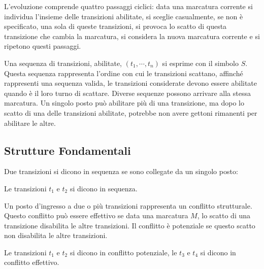 \documentclass{article}
\numberwithin{equation}{subsection}
\begin{document}
L'evoluzione comprende quattro passaggi ciclici: data una marcatura corrente si individua l'insieme delle transizioni abilitate, si sceglie casualmente, se non è specificato, 
una sola di queste transizioni, si provoca lo scatto di questa transizione che cambia la marcatura, si considera la nuova marcatura corrente e si ripetono questi passaggi. 

Una sequenza di transizioni, abilitate, $(t_1,\cdots,t_n)$ si esprime con il simbolo $S$. Questa sequenza rappresenta l'ordine con cui le transizioni scattano, affinché 
rappresenti una sequenza valida, le transizioni considerate devono essere abilitate quando è il loro turno di scattare. Diverse sequenze possono arrivare alla stessa 
marcatura. 
Un singolo posto può abilitare più di una transizione, ma dopo lo scatto di una delle transizioni abilitate, potrebbe non avere gettoni rimanenti per abilitare le altre. 

\subsection{Strutture Fondamentali}

Due transizioni si dicono in sequenza se sono collegate da un singolo posto:
\begin{center}
\end{center}
Le transizioni $t_1$ e $t_2$ si dicono in sequenza. 


Un posto d'ingresso a due o più transizioni rappresenta un conflitto strutturale. Questo conflitto può essere effettivo se data una marcatura $M$, lo scatto di una transizione 
disabilita le altre transizioni. Il conflitto è potenziale se questo scatto non disabilita le altre transizioni. 
\begin{center}
\end{center}
Le transizioni $t_1$ e $t_2$ si dicono in conflitto potenziale, le $t_3$ e $t_4$ si dicono in conflitto effettivo. 
\end{document}
